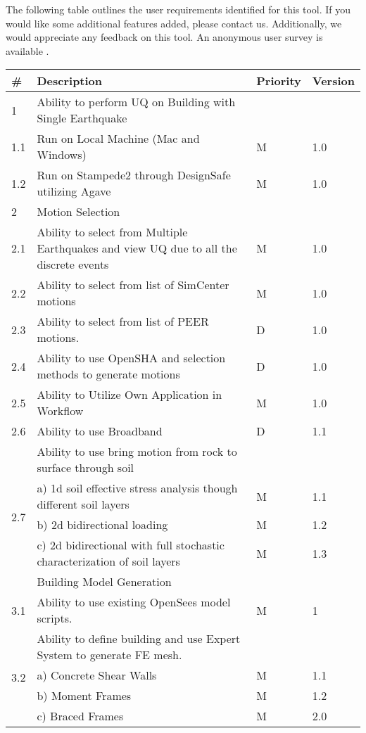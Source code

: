 The following table outlines the user requirements identified for this
tool. If you would like some additional features added, please contact us.
Additionally, we would appreciate any feedback on this tool. An anonymous
user survey is available .

\begin{table}[hbt!]                 
  \centering
\begin{adjustbox}{max width=\textwidth}            
  \begin{tabular}{llll}                    
    \toprule          
      \# & Description & Priority & Version \\ \hline
    
      1 & Ability to perform UQ on Building with Single Earthquake &  &  \\ \hline
	1.1 & Run on Local Machine (Mac and Windows) & M & 1.0 \\ \hline
	1.2 & Run on Stampede2 through DesignSafe utilizing Agave & M & 1.0 \\ \hline
	2 & Motion Selection &  &  \\ \hline
	2.1 & Ability to select from Multiple Earthquakes and view UQ due to all the discrete events & M & 1.0  \\ \hline
	2.2 & Ability to select from list of SimCenter motions & M & 1.0 \\ \hline
	2.3 & Ability to select from list of PEER motions. & D & 1.0 \\ \hline
	2.4 & Ability to use OpenSHA and selection methods to generate motions & D & 1.0 \\ \hline
	2.5 & Ability to Utilize Own Application in Workflow & M & 1.0 \\ \hline
	2.6 & Ability to use Broadband & D & 1.1 \\ \hline
	\multirow{5}{*}{2.7} 
	& Ability to use bring motion from rock to surface through soil &  &  \\ 
	 & a)     1d soil effective stress analysis though different soil layers & M & 1.1  \\ 
	 & b)     2d bidirectional loading & M & 1.2 \\ 
	 & c)     2d bidirectional with full stochastic characterization of soil layers & M & 1.3 \\ \hline

	3 & Building Model Generation &  &  \\ \hline
	3.1 & Ability to use existing OpenSees model scripts. & M & 1 \\ \hline
	\multirow{5}{*}{3.2}  & Ability to define building and use Expert System to generate FE mesh. &  &  \\
	 & a)     Concrete Shear Walls & M & 1.1 \\ 
	 & b)     Moment Frames & M & 1.2 \\ 
	 & c)     Braced Frames & M & 2.0  \\ \hline
	 

\end{tabular}
\end{adjustbox}
\end{table}

